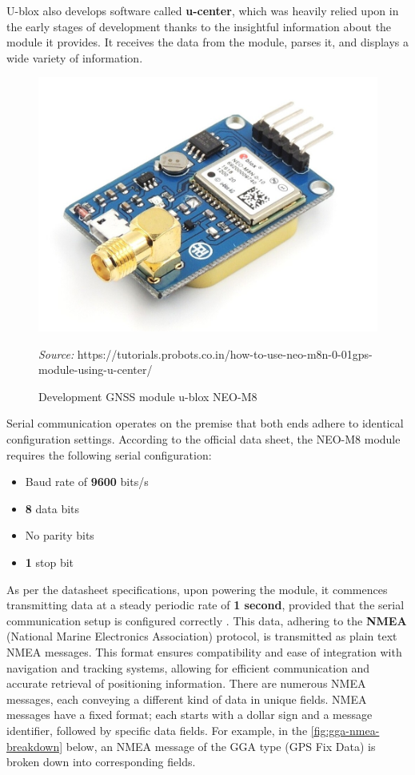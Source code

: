 \documentclass[FM,BP,EN,fonts]{tulthesis}
\begin{document}
U-blox also develops software called \textbf{u-center}, which was heavily relied upon in the early stages of development thanks to the insightful information about the module it provides. It receives the data from the module, parses it, and displays a wide variety of information.

\begin{figure}[ht]
    \centering
    \includegraphics[scale=.4]{media/neo-m8.jpg}
    \caption{Development GNSS module u-blox NEO-M8}
    \textit{Source:} https://tutorials.probots.co.in/how-to-use-neo-m8n-0-01gps-module-using-u-center/
    \label{fig:neo-m8}
\end{figure}

Serial communication operates on the premise that both ends adhere to identical configuration settings. According to the official data sheet, the NEO-M8 module requires the following serial configuration:

\begin{itemize}
    \item Baud rate of \textbf{9600} bits/s
    \item \textbf{8} data bits
    \item No parity bits
    \item \textbf{1} stop bit
\end{itemize}

As per the datasheet specifications, upon powering the module, it commences transmitting data at a steady periodic rate of \textbf{1 second}, provided that the serial communication setup is configured correctly \cite{neo-m8-datasheet}. This data, adhering to the \textbf{NMEA} (National Marine Electronics Association) protocol, is transmitted as plain text NMEA messages. This format ensures compatibility and ease of integration with navigation and tracking systems, allowing for efficient communication and accurate retrieval of positioning information. There are numerous NMEA messages, each conveying a different kind of data in unique fields. NMEA messages have a fixed format; each starts with a dollar sign and a message identifier, followed by specific data fields. For example, in the \autoref{fig:gga-nmea-breakdown} below, an NMEA message of the GGA type (GPS Fix Data) is broken down into corresponding fields.
\end{document}
